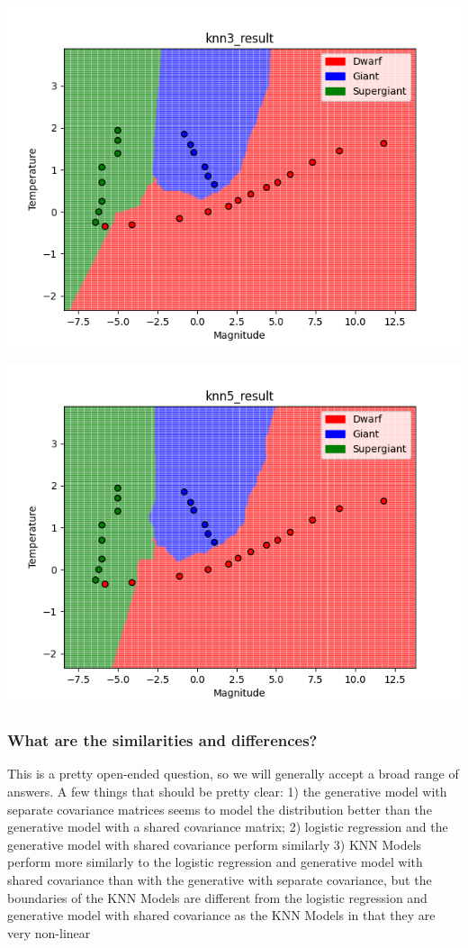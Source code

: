 \documentclass[submit]{harvardml}
\begin{document}
\begin{enumerate}
        \begin{center}
            \includegraphics[scale=0.5]{solutions/knn3_result.png}
        \end{center}

        \begin{center}
            \includegraphics[scale=0.5]{solutions/knn5_result.png}
        \end{center}

        \subsubsection*{What are the similarities and differences?}
        This is a pretty open-ended question, so we will generally accept a broad range of answers. A few things that should be pretty clear: 1) the generative model with separate covariance matrices seems to model the distribution better than the generative model with a shared covariance matrix; 2) logistic regression and the generative model with shared covariance perform similarly 3) KNN Models perform more similarly to the logistic regression and generative model with shared covariance than with the generative with separate covariance, but the boundaries of the KNN Models are different from the logistic regression and generative model with shared covariance as the KNN Models in that they are very non-linear



\end{enumerate}
\end{document}
